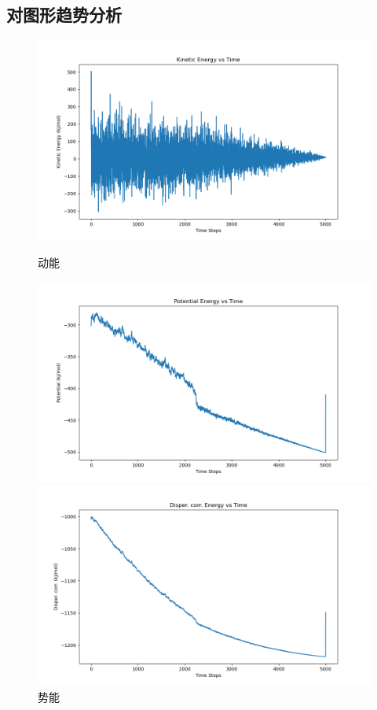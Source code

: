 \documentclass[12pt, a4paper, oneside]{ctexart}
\begin{document}
\begin{spacing}{2.0}
\subsection{对图形趋势分析}
\begin{figure}[H]
  \begin{minipage}[t]{0.5\linewidth}
      \centering
      \includegraphics[scale=0.3]{kinetic_energy_plot.png}
      \caption{动能}
      \label{fig:side:a}
    \end{minipage}%
    \begin{minipage}[t]{0.5\linewidth}
      \centering
      \includegraphics[scale=0.3]{potential_energy_plot.png}
      \caption{势能}
      \label{fig:side:b}
    \end{minipage}
    \begin{minipage}[t]{0.5\linewidth}
      \centering
      \includegraphics[scale=0.3]{disper_corr_energy_plot.png}

\end{minipage}
\end{figure}
\end{spacing}
\end{document}
